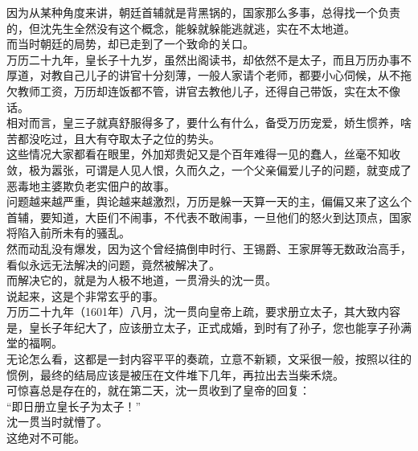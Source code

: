 \begin{multicols}{\theparacolNo}
因为从某种角度来讲，朝廷首辅就是背黑锅的，国家那么多事，总得找一个负责的，但沈先生全然没有这个概念，能躲就躲能逃就逃，实在不太地道。\\

而当时朝廷的局势，却已走到了一个致命的关口。\\

万历二十九年，皇长子十九岁，虽然出阁读书，却依然不是太子，而且万历办事不厚道，对教自己儿子的讲官十分刻薄，一般人家请个老师，都要小心伺候，从不拖欠教师工资，万历却连饭都不管，讲官去教他儿子，还得自己带饭，实在太不像话。\\

相对而言，皇三子就真舒服得多了，要什么有什么，备受万历宠爱，娇生惯养，啥苦都没吃过，且大有夺取太子之位的势头。\\

这些情况大家都看在眼里，外加郑贵妃又是个百年难得一见的蠢人，丝毫不知收敛，极为嚣张，可谓是人见人恨，久而久之，一个父亲偏爱儿子的问题，就变成了恶毒地主婆欺负老实佃户的故事。\\

问题越来越严重，舆论越来越激烈，万历是躲一天算一天的主，偏偏又来了这么个首辅，要知道，大臣们不闹事，不代表不敢闹事，一旦他们的怒火到达顶点，国家将陷入前所未有的骚乱。\\

然而动乱没有爆发，因为这个曾经搞倒申时行、王锡爵、王家屏等无数政治高手，看似永远无法解决的问题，竟然被解决了。\\

而解决它的，就是为人极不地道，一贯滑头的沈一贯。\\

说起来，这是个非常玄乎的事。\\

万历二十九年（1601年）八月，沈一贯向皇帝上疏，要求册立太子，其大致内容是，皇长子年纪大了，应该册立太子，正式成婚，到时有了孙子，您也能享子孙满堂的福啊。\\

无论怎么看，这都是一封内容平平的奏疏，立意不新颖，文采很一般，按照以往的惯例，最终的结局应该是被压在文件堆下几年，再拉出去当柴禾烧。\\

可惊喜总是存在的，就在第二天，沈一贯收到了皇帝的回复：\\

“即日册立皇长子为太子！”\\

沈一贯当时就懵了。\\

这绝对不可能。\\


\end{multicols}
